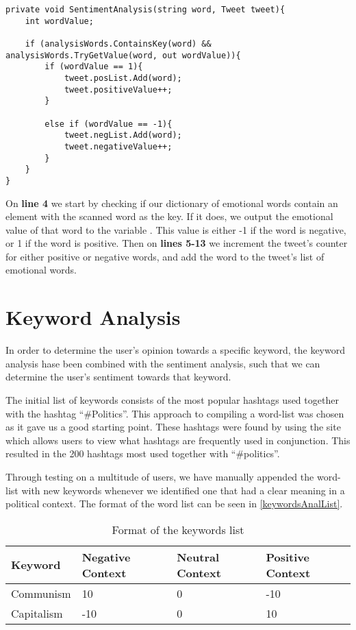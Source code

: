 \begin{minipage}[H]{\linewidth}
\begin{lstlisting}[caption = Determining the sentiment of a tweet , label = sentiAnalCode] 
private void SentimentAnalysis(string word, Tweet tweet){
	int wordValue;

    if (analysisWords.ContainsKey(word) && analysisWords.TryGetValue(word, out wordValue)){
    	if (wordValue == 1){
        	tweet.posList.Add(word);
            tweet.positiveValue++;
        }

        else if (wordValue == -1){
        	tweet.negList.Add(word);
            tweet.negativeValue++;
        }
    }
}
\end{lstlisting}
\end{minipage}

On \textbf{line 4} we start by checking if our dictionary of emotional words
contain an element with the scanned word as the key. If it does, we output the
emotional value of that word to the variable . This value is
either -1 if the word is negative, or 1 if the word is positive. Then on
\textbf{lines 5-13} we increment the tweet's counter for either positive or
negative words, and add the word to the tweet's list of emotional words.

\section{Keyword Analysis}
In order to determine the user's opinion towards a specific keyword, the keyword
analysis hase been combined with the sentiment analysis, such that we can
determine the user's sentiment towards that keyword.

The initial list of keywords consists of the most popular hashtags used together
with the hashtag ``\#Politics''. This approach to compiling a word-list was
chosen as it gave us a good starting point. These hashtags were found by using
the site  which allows users to
view what hashtags are frequently used in conjunction. This resulted in the 200 hashtags most used
together with ``\#politics''.\nl

Through testing on a multitude of users, we have manually appended the word-list
with new keywords whenever we identified one that had a clear meaning in a
political context. The format of the word list can be seen in
\autoref{keywordsAnalList}.\\

\begin{table}[H]
\begin{tabular}{|l|l|l|l|}
\textbf{Keyword} & \textbf{Negative Context} & \textbf{Neutral Context} & \textbf{Positive Context} \\\hline
Communism & 10 & 0 & -10 \\\hline
Capitalism & -10 & 0 & 10 \\\hline
\end{tabular}
\caption{Format of the keywords list}
\label{keywordsAnalList}
\end{table} 

